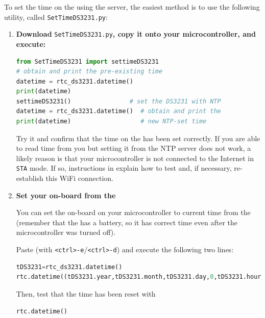 To set the time on the  using the \ntp server, the easiest method is to use the following utility, called \texttt{SetTimeDS3231.py}:

%
\begin{enumerate}[resume]
	\item \textbf{Download} \lstinline{SetTimeDS3231.py}\textbf{, copy it onto your microcontroller, and execute:} 
\begin{lstlisting}[language=Python]
from SetTimeDS3231 import settimeDS3231
# obtain and print the pre-existing time
datetime = rtc_ds3231.datetime()  
print(datetime)                
settimeDS3231()                # set the DS3231 with NTP
datetime = rtc_ds3231.datetime()  # obtain and print the
print(datetime)                   # new NTP-set time
\end{lstlisting}
	Try it and confirm that the time on the  \rtc has been set correctly.
	If you are able to read time from you  but setting it from the NTP server does not work, a likely reason is that your microcontroller is not connected to the Internet in \texttt{STA} mode. 
	If so, instructions in  explain how to test and, if necessary, re-establish this WiFi connection. 

	\item \textbf{Set your on-board \rtc from the } 
	
	You can set the on-board \rtc on your microcontroller to current time from the  (remember that the  has a battery, so it has correct time even after the microcontroller was turned off).
	
	\smallskip
	Paste (with \texttt{<ctrl>-e}/\texttt{<ctrl>-d}) and execute the following two lines:
\begin{lstlisting}[language=Python]
tDS3231=rtc_ds3231.datetime()
rtc.datetime((tDS3231.year,tDS3231.month,tDS3231.day,0,tDS3231.hour,tDS3231.minute,tDS3231.second,0))
\end{lstlisting}
	Then, test that the time has been reset with
\begin{lstlisting}[language=Python]
rtc.datetime()
\end{lstlisting}
\end{enumerate}

